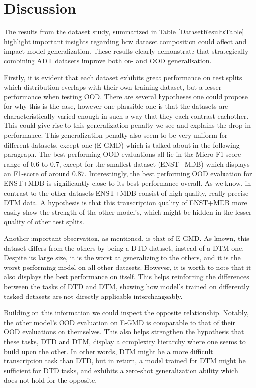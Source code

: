 \section{Discussion}

The results from the dataset study, summarized in Table \ref{DatasetResultsTable} highlight important insights regarding how dataset composition could affect and impact model generalization. These results clearly demonstrate that strategically combining \gls{ADT} datasets improve both on- and \acrfull{OOD} generalization.

Firstly, it is evident that each dataset exhibits great performance on test splits which distribution overlaps with their own training dataset, but a lesser performance when testing \gls{OOD}. There are several hypotheses one could propose for why this is the case, however one plausible one is that the datasets are characteristically varied enough in such a way that they each contrast eachother. This could give rise to this generalization penalty we see and explains the drop in performance. This generalization penalty also seem to be very uniform for different datasets, except one (E-GMD) which is talked about in the following paragraph. The best performing \gls{OOD} evaluations all lie in the Micro F1-score range of $0.6$ to $0.7$, except for the smallest dataset (ENST+MDB) which displays an F1-score of around $0.87$. Interestingly, the best performing \gls{OOD} evaluation for ENST+MDB is significantly close to its best performance overall. As we know, in contrast to the other datasets ENST+MDB consist of high quality, really precise \gls{DTM} data. A hypothesis is that this transcription quality of ENST+MDB more easily show the strength of the other model's, which might be hidden in the lesser quality of other test splits.

Another important observation, as mentioned, is that of E-GMD. As known, this dataset differs from the others by being a \acrfull{DTD} dataset, instead of a \gls{DTM} one. Despite its large size, it is the worst at generalizing to the others, and it is the worst performing model on all other datasets. However, it is worth to note that it also displays the best performance on itself. This helps reinforcing the differences between the tasks of \gls{DTD} and \gls{DTM}, showing how model's trained on differently tasked datasets are not directly applicable interchangeably. 

Building on this information we could inspect the opposite relationship. Notably, the other model's \gls{OOD} evaluation on E-GMD is comparable to that of their \gls{OOD} evaluations on themselves. This also helps strengthen the hypothesis that these tasks, \gls{DTD} and \gls{DTM}, display a complexity hierarchy where one seems to build upon the other. In other words, \gls{DTM} might be a more difficult transcription task than \gls{DTD}, but in return, a model trained for \gls{DTM} might be sufficient for \gls{DTD} tasks, and exhibits a zero-shot generalization ability which does not hold for the opposite.


